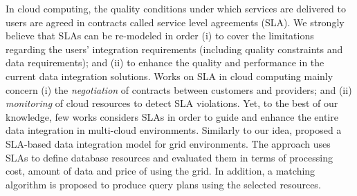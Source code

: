 In cloud computing, the quality conditions under which services are delivered to users are agreed in contracts called service level agreements (SLA). We strongly believe that SLAs can be re-modeled in order (i) to cover the limitations regarding the users' integration requirements (including quality constraints and data requirements); and (ii) to enhance the quality and performance in the current data integration solutions. 
%
Works on SLA in cloud computing mainly concern (i) the \textit{negotiation} of contracts between customers and providers; and (ii) \textit{monitoring} of cloud resources to detect SLA violations.
Yet, to the best of our knowledge, few works considers SLAs in order to guide and enhance the entire data integration in multi-cloud environments.
Similarly to our idea, \cite{Nie07} proposed a SLA-based data integration model for grid environments. The approach uses SLAs to define database resources and evaluated them in terms of processing cost, amount of data and price of using the grid. In addition, a matching algorithm is proposed to produce query plans using the selected resources. 


